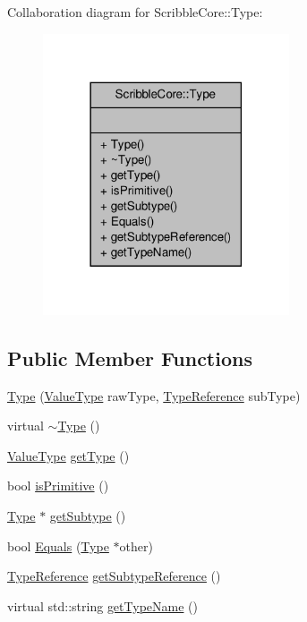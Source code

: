 Collaboration diagram for Scribble\-Core\-:\-:Type\-:
\nopagebreak
\begin{figure}[H]
\begin{center}
\leavevmode
\includegraphics[width=206pt]{class_scribble_core_1_1_type__coll__graph}
\end{center}
\end{figure}
\subsection*{Public Member Functions}
\begin{DoxyCompactItemize}
\item 
\hyperlink{class_scribble_core_1_1_type_a2d6f4b2fd9cfe25e15441e8d7b441710}{Type} (\hyperlink{namespace_scribble_core_a0727ed627ce26b81336440a5edecebfb}{Value\-Type} raw\-Type, \hyperlink{namespace_scribble_core_a0e685a305b14aa5f0504df1369ba270b}{Type\-Reference} sub\-Type)
\item 
virtual \hyperlink{class_scribble_core_1_1_type_a9f14cc9e575af1bc894cb8e49fb9a6bc}{$\sim$\-Type} ()
\item 
\hyperlink{namespace_scribble_core_a0727ed627ce26b81336440a5edecebfb}{Value\-Type} \hyperlink{class_scribble_core_1_1_type_a7b465695c97c0e07457f46c7ac18a96c}{get\-Type} ()
\item 
bool \hyperlink{class_scribble_core_1_1_type_ae3668b9dc9195516bfdeb9f2265d78a5}{is\-Primitive} ()
\item 
\hyperlink{class_scribble_core_1_1_type}{Type} $\ast$ \hyperlink{class_scribble_core_1_1_type_a65ef83531886c3aba0f7f7e89caaeaf1}{get\-Subtype} ()
\item 
bool \hyperlink{class_scribble_core_1_1_type_add26d29b25d99be9bc7f769e53539c24}{Equals} (\hyperlink{class_scribble_core_1_1_type}{Type} $\ast$other)
\item 
\hyperlink{namespace_scribble_core_a0e685a305b14aa5f0504df1369ba270b}{Type\-Reference} \hyperlink{class_scribble_core_1_1_type_ad0f401473ee20d081314cd3f7fbe1739}{get\-Subtype\-Reference} ()
\item 
virtual std\-::string \hyperlink{class_scribble_core_1_1_type_aa3eeef0216f910c6a2ae8047336b51f1}{get\-Type\-Name} ()
\end{DoxyCompactItemize}


